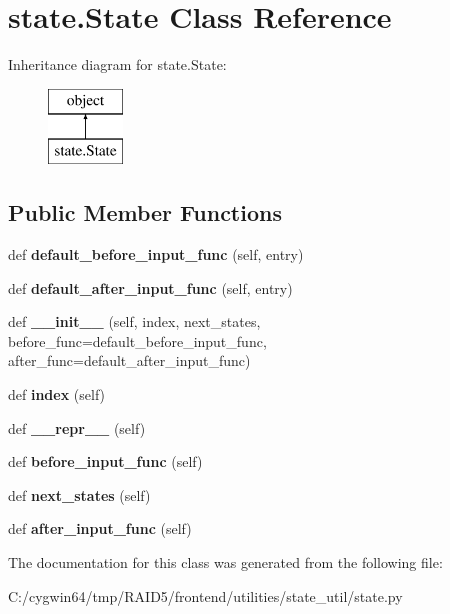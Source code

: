 \hypertarget{classstate_1_1_state}{}\section{state.\+State Class Reference}
\label{classstate_1_1_state}
Inheritance diagram for state.\+State\+:\begin{figure}[H]
\begin{center}
\leavevmode
\includegraphics[height=2.000000cm]{classstate_1_1_state}
\end{center}
\end{figure}
\subsection*{Public Member Functions}
\begin{DoxyCompactItemize}
\item 
\mbox{\label{classstate_1_1_state_a1223ba69c96efe9b11806a1a7a1c842a}} 
def {\bfseries default\+\_\+before\+\_\+input\+\_\+func} (self, entry)
\item 
\mbox{\label{classstate_1_1_state_ae616a6915ae566c7fb4d0f9ba0bf9898}} 
def {\bfseries default\+\_\+after\+\_\+input\+\_\+func} (self, entry)
\item 
\mbox{\label{classstate_1_1_state_aa5a9abc5fbbcba7d22900849175c2802}} 
def {\bfseries \+\_\+\+\_\+init\+\_\+\+\_\+} (self, index, next\+\_\+states, before\+\_\+func=default\+\_\+before\+\_\+input\+\_\+func, after\+\_\+func=default\+\_\+after\+\_\+input\+\_\+func)
\item 
\mbox{\label{classstate_1_1_state_a5367de7c27bb7209456b6c0676640c89}} 
def {\bfseries index} (self)
\item 
\mbox{\label{classstate_1_1_state_a849853c72dd3a2f02c05e25b4df2a51d}} 
def {\bfseries \+\_\+\+\_\+repr\+\_\+\+\_\+} (self)
\item 
\mbox{\label{classstate_1_1_state_ad973951b42a2832659ec4d22a164fa2f}} 
def {\bfseries before\+\_\+input\+\_\+func} (self)
\item 
\mbox{\label{classstate_1_1_state_ad1c54813b9a4ad605443a78f61bedc9e}} 
def {\bfseries next\+\_\+states} (self)
\item 
\mbox{\label{classstate_1_1_state_a39854b37bfe953c78a3ca0d8cd58a723}} 
def {\bfseries after\+\_\+input\+\_\+func} (self)
\end{DoxyCompactItemize}


The documentation for this class was generated from the following file\+:\begin{DoxyCompactItemize}
\item 
C\+:/cygwin64/tmp/\+R\+A\+I\+D5/frontend/utilities/state\+\_\+util/state.\+py\end{DoxyCompactItemize}
